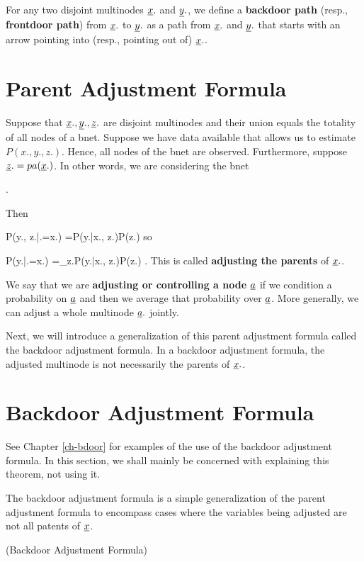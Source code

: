 For any two
disjoint
multinodes $\rvx.$
and $\rvy.$,
we define a {\bf backdoor path}  (resp., {\bf frontdoor path})
from $\rvx.$ to $\rvy.$
as a path from $\rvx.$
and $\rvy.$ that
starts with an arrow pointing into (resp., 
pointing out of)
$\rvx.$.


\section{Parent Adjustment Formula}


Suppose
that $\rvx., \rvy., \rvz.$
are disjoint multinodes
and their union equals
 the
totality of all nodes of
a bnet.
Suppose we have data
available that allows us  to
estimate $P(x., y., z.)$.
Hence, all nodes of the bnet
are observed.
Furthermore,
suppose $\rvz.=pa(\rvx.)$.
In other words,
we are
considering the bnet

\beq
{}
\;.
\eeq

Then

\beq
P(y., z.|\cald \rvx.=x.)
=P(y.|x., z.)P(z.)
\eeq
so

\beq
P(y.|\cald \rvx.=x.)
=\sum_{z.}P(y.|x., z.)P(z.)
\;.
\eeq
This is called
{\bf adjusting the parents}
of $\rvx.$.


We say that
we are {\bf adjusting
or controlling a node $\rva$}
if we condition
a probability on $\rva$ and
then we average
that probability over $\rva$.
More generally,
we can adjust a whole
multinode $\rva.$ jointly.

Next,
we will introduce
a generalization
of
this parent adjustment formula
called the
backdoor adjustment formula.
In a backdoor adjustment formula,
the adjusted multinode
is not necessarily
 the parents of $\rvx.$.

\section{Backdoor Adjustment Formula}

See Chapter \ref{ch-bdoor}
for examples of the use of the
backdoor adjustment formula.
In this section,
we shall mainly be
concerned with
explaining this
theorem, not using it.

The backdoor adjustment formula is a simple generalization
of the parent adjustment formula to encompass 
cases where the variables being adjusted are 
not all patents of $\rvx$.


\bdoordef

\begin{claim} (Backdoor
Adjustment Formula)

\bdoorclaim
\end{claim}
\proof

